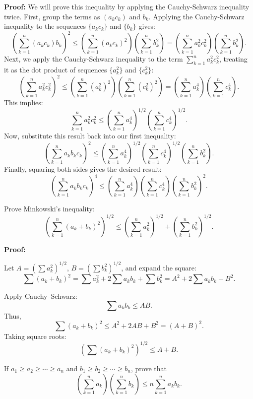 \textbf{Proof:}
We will prove this inequality by applying the Cauchy-Schwarz inequality twice.
First, group the terms as $(a_k c_k)$ and $b_k$. Applying the Cauchy-Schwarz inequality to the sequences $\{a_k c_k\}$ and $\{b_k\}$ gives:
\[
\left( \sum_{k=1}^n (a_k c_k) b_k \right)^2 \leq \left( \sum_{k=1}^n (a_k c_k)^2 \right) \left( \sum_{k=1}^n b_k^2 \right) = \left( \sum_{k=1}^n a_k^2 c_k^2 \right) \left( \sum_{k=1}^n b_k^2 \right).
\]
Next, we apply the Cauchy-Schwarz inequality to the term $\sum_{k=1}^n a_k^2 c_k^2$, treating it as the dot product of sequences $\{a_k^2\}$ and $\{c_k^2\}$:
\[
\left( \sum_{k=1}^n a_k^2 c_k^2 \right)^2 \leq \left( \sum_{k=1}^n (a_k^2)^2 \right) \left( \sum_{k=1}^n (c_k^2)^2 \right) = \left( \sum_{k=1}^n a_k^4 \right) \left( \sum_{k=1}^n c_k^4 \right).
\]
This implies:
\[
\sum_{k=1}^n a_k^2 c_k^2 \leq \left( \sum_{k=1}^n a_k^4 \right)^{1/2} \left( \sum_{k=1}^n c_k^4 \right)^{1/2}.
\]
Now, substitute this result back into our first inequality:
\[
\left( \sum_{k=1}^n a_k b_k c_k \right)^2 \leq \left( \sum_{k=1}^n a_k^4 \right)^{1/2} \left( \sum_{k=1}^n c_k^4 \right)^{1/2} \left( \sum_{k=1}^n b_k^2 \right).
\]
Finally, squaring both sides gives the desired result:
\[
\left( \sum_{k=1}^n a_k b_k c_k \right)^4 \leq \left( \sum_{k=1}^n a_k^4 \right) \left( \sum_{k=1}^n c_k^4 \right) \left( \sum_{k=1}^n b_k^2 \right)^2.
\]

\begin{problembox}
Prove Minkowski’s inequality:
\[
\left( \sum_{k=1}^n (a_k + b_k)^2 \right)^{1/2} \leq \left( \sum_{k=1}^n a_k^2 \right)^{1/2} + \left( \sum_{k=1}^n b_k^2 \right)^{1/2}.
\]
\end{problembox}

\textbf{Proof:}

Let \( A = \left( \sum a_k^2 \right)^{1/2} \), \( B = \left( \sum b_k^2 \right)^{1/2} \), and expand the square:
\[
\sum (a_k + b_k)^2 = \sum a_k^2 + 2\sum a_k b_k + \sum b_k^2 = A^2 + 2\sum a_k b_k + B^2.
\]

Apply Cauchy–Schwarz:
\[
\sum a_k b_k \leq A B.
\]
Thus,
\[
\sum (a_k + b_k)^2 \leq A^2 + 2AB + B^2 = (A + B)^2.
\]
Taking square roots:
\[
\left( \sum (a_k + b_k)^2 \right)^{1/2} \leq A + B.
\]


\begin{problembox}
If \( a_1 \geq a_2 \geq \cdots \geq a_n \) and \( b_1 \geq b_2 \geq \cdots \geq b_n \), prove that
\[
\left( \sum_{k=1}^n a_k \right)\left( \sum_{k=1}^n b_k \right) \leq n \sum_{k=1}^n a_k b_k.
\]
\end{problembox}

